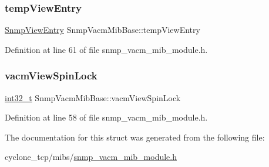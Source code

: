\subsubsection{\texorpdfstring{temp\+View\+Entry}{tempViewEntry}}
{\footnotesize\ttfamily \hyperlink{structSnmpViewEntry}{Snmp\+View\+Entry} Snmp\+Vacm\+Mib\+Base\+::temp\+View\+Entry}



Definition at line 61 of file snmp\+\_\+vacm\+\_\+mib\+\_\+module.\+h.

\mbox{\label{structSnmpVacmMibBase_abafbd601b9a27b6e57d7ef267e9c4874}} 
\subsubsection{\texorpdfstring{vacm\+View\+Spin\+Lock}{vacmViewSpinLock}}
{\footnotesize\ttfamily \hyperlink{stdint_8h_ab1967d8591af1a4e48c37fd2b0f184d0}{int32\+\_\+t} Snmp\+Vacm\+Mib\+Base\+::vacm\+View\+Spin\+Lock}



Definition at line 58 of file snmp\+\_\+vacm\+\_\+mib\+\_\+module.\+h.



The documentation for this struct was generated from the following file\+:\begin{DoxyCompactItemize}
\item 
cyclone\+\_\+tcp/mibs/\hyperlink{snmp__vacm__mib__module_8h}{snmp\+\_\+vacm\+\_\+mib\+\_\+module.\+h}\end{DoxyCompactItemize}
